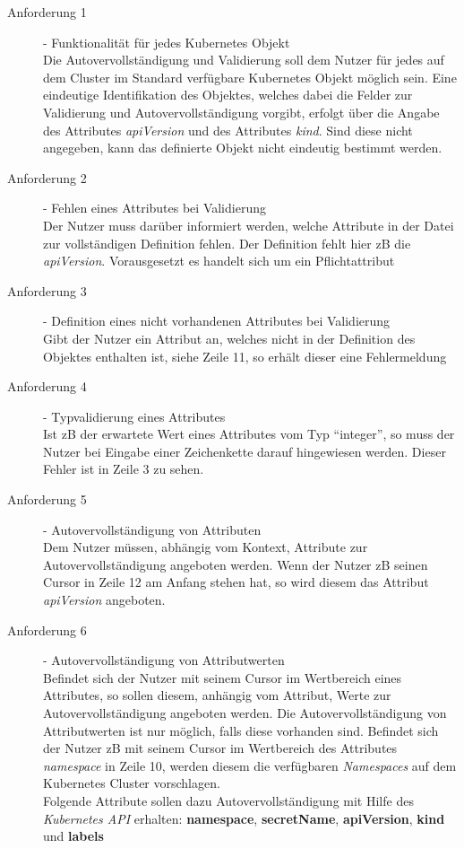 \begin{description}
      \item[Anforderung 1]{- Funktionalität für jedes Kubernetes Objekt\\}
            Die Autovervollständigung und Validierung soll dem Nutzer für jedes auf dem Cluster im Standard verfügbare Kubernetes Objekt möglich sein.
            Eine eindeutige Identifikation des Objektes, welches dabei die Felder zur Validierung und Autovervollständigung vorgibt, erfolgt über
            die Angabe des Attributes \textit{apiVersion} und des Attributes \textit{kind}. Sind diese nicht angegeben, kann das definierte Objekt nicht
            eindeutig bestimmt werden.
      \item[Anforderung 2]{- Fehlen eines Attributes bei Validierung\\}
            Der Nutzer muss darüber informiert werden, welche Attribute
            in der Datei zur vollständigen Definition fehlen. Der Definition fehlt hier \ac{zB}
            die \textit{apiVersion}. Vorausgesetzt es handelt sich um ein Pflichtattribut
      \item[Anforderung 3]{- Definition eines nicht vorhandenen Attributes bei Validierung\\}
            Gibt der Nutzer ein Attribut an, welches nicht in der Definition des Objektes enthalten ist, siehe Zeile 11, so erhält dieser eine Fehlermeldung
      \item[Anforderung 4]{- Typvalidierung eines Attributes\\}
            Ist \ac{zB} der erwartete Wert eines Attributes vom Typ ``integer'',
            so muss der Nutzer bei Eingabe einer Zeichenkette darauf hingewiesen werden. Dieser Fehler ist in Zeile 3 zu sehen.
      \item[Anforderung 5]{- Autovervollständigung von Attributen\\}
            Dem Nutzer müssen, abhängig vom Kontext, Attribute zur Autovervollständigung angeboten werden.
            Wenn der Nutzer \ac{zB} seinen Cursor in Zeile 12 am Anfang stehen hat, so wird diesem das Attribut \textit{apiVersion} angeboten.
      \item[Anforderung 6]{- Autovervollständigung von Attributwerten\\}
            Befindet sich der Nutzer mit seinem Cursor im Wertbereich eines Attributes, so sollen diesem, anhängig vom Attribut, Werte zur Autovervollständigung
            angeboten werden. Die Autovervollständigung von Attributwerten ist nur möglich, falls diese vorhanden sind.
            Befindet sich der Nutzer \ac{zB} mit seinem Cursor im Wertbereich des Attributes \textit{namespace} in Zeile 10,
            werden diesem die verfügbaren \textit{Namespaces} auf dem Kubernetes Cluster vorschlagen.
            \\
            Folgende Attribute sollen dazu Autovervollständigung mit Hilfe des \textit{Kubernetes API} erhalten:
            \textbf{namespace}, \textbf{secretName}, \textbf{apiVersion}, \textbf{kind} und \textbf{labels}
\end{description}

